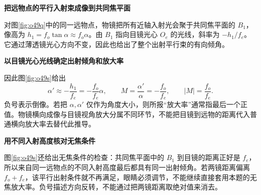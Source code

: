 \begin{solution}\textbf{把远物点的平行入射束成像到共同焦平面}\par\nobreak
对图\ref{fig:o49q}中的同一远物点，物镜把所有近轴入射光会聚于共同焦平面的 \(B_1\)，像高为 \(h_1=f_o\tan\alpha\approx f_o\alpha\)。由 \(B_1\) 指向目镜光心 \(O_e\) 的光线，斜率为 \(-h_1/f_e\)。它通过薄透镜光心方向不变，因此也给出了整个出射平行束的有向倾角。



\par\medskip{}\noindent\textbf{以目镜光心光线确定出射倾角和放大率}\par\nobreak
因此图\ref{fig:o49s}给出
\[
 \alpha'\approx-\frac{h_1}{f_e}=-\frac{f_o}{f_e}\alpha,
 \qquad\boxed{M=\frac{\alpha'}\alpha=-\frac{f_o}{f_e}},
 \qquad\boxed{|M|=\frac{f_o}{f_e}}.
\]
负号表示倒像。若把 \(\alpha,\alpha'\) 仅作为角度大小，则所报“放大率”通常指最后一个正值。物镜横向成像与目镜视角放大分属不同环节，不能把目镜到远物的距离代入普通横向放大率去替代此推导。



\par\medskip{}\noindent\textbf{用不同入射高度核对无焦条件}\par\nobreak
图\ref{fig:o49s}还给出无焦条件的检查：共同焦平面中的 \(B_1\) 到目镜的距离正好是 \(f_e\)，所以来自同一远物点的不同入射高度最后都具有同一出射倾角。若两镜距离偏离 \(f_o+f_e\)，该平行出射条件就不再满足，眼睛必须调节，不能继续直接套用本题的无焦放大率。负号描述方向反转，不能通过把两镜距离取绝对值来消去。
\end{solution}

